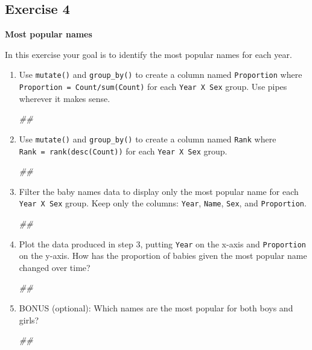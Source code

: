 \documentclass[]{book}
\newenvironment{Shaded}{\begin{snugshade}}{\end{snugshade}}
\newcommand{\CommentTok}[1]{\textcolor[rgb]{0.56,0.35,0.01}{\textit{#1}}}
\begin{document}
\hypertarget{exercise-4}{%
\subsection{Exercise 4}\label{exercise-4}}

\textbf{Most popular names}

In this exercise your goal is to identify the most popular names for each year.

\begin{enumerate}
\def\labelenumi{\arabic{enumi}.}
\item
  Use \texttt{mutate()} and \texttt{group\_by()} to create a column named \texttt{Proportion}
  where \texttt{Proportion\ =\ Count/sum(Count)} for each \texttt{Year\ X\ Sex} group.
  Use pipes wherever it makes sense.

\begin{Shaded}
\begin{Highlighting}[]
\CommentTok{##}
\end{Highlighting}
\end{Shaded}
\item
  Use \texttt{mutate()} and \texttt{group\_by()} to create a column named \texttt{Rank} where
  \texttt{Rank\ =\ rank(desc(Count))} for each \texttt{Year\ X\ Sex} group.

\begin{Shaded}
\begin{Highlighting}[]
\CommentTok{##}
\end{Highlighting}
\end{Shaded}
\item
  Filter the baby names data to display only the most popular name
  for each \texttt{Year\ X\ Sex} group. Keep only the columns: \texttt{Year}, \texttt{Name},
  \texttt{Sex}, and \texttt{Proportion}.

\begin{Shaded}
\begin{Highlighting}[]
\CommentTok{##}
\end{Highlighting}
\end{Shaded}
\item
  Plot the data produced in step 3, putting \texttt{Year} on the x-axis
  and \texttt{Proportion} on the y-axis. How has the proportion of babies
  given the most popular name changed over time?

\begin{Shaded}
\begin{Highlighting}[]
\CommentTok{##}
\end{Highlighting}
\end{Shaded}
\item
  BONUS (optional): Which names are the most popular for both boys and girls?

\begin{Shaded}
\begin{Highlighting}[]
\CommentTok{##}
\end{Highlighting}
\end{Shaded}
\end{enumerate}
\end{document}
